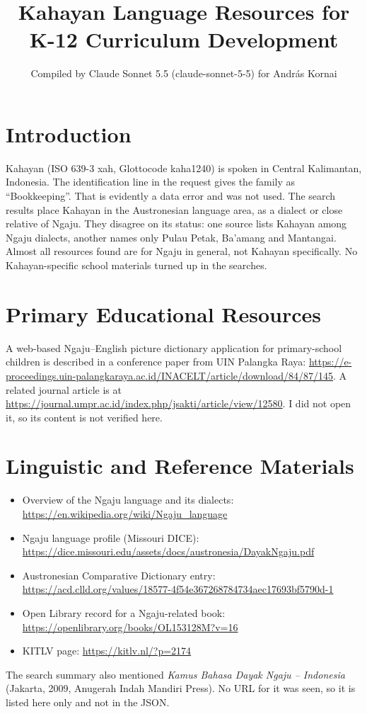 \documentclass[12pt]{article}
\title{Kahayan Language Resources for K-12 Curriculum Development}
\author{Compiled by Claude Sonnet 5.5 (claude-sonnet-5-5) for Andr\'as Kornai}
\date{}
\begin{document}
\maketitle

\section{Introduction}
Kahayan (ISO 639-3 xah, Glottocode kaha1240) is spoken in Central Kalimantan, Indonesia. The identification line in the request gives the family as ``Bookkeeping''. That is evidently a data error and was not used. The search results place Kahayan in the Austronesian language area, as a dialect or close relative of Ngaju. They disagree on its status: one source lists Kahayan among Ngaju dialects, another names only Pulau Petak, Ba'amang and Mantangai. Almost all resources found are for Ngaju in general, not Kahayan specifically. No Kahayan-specific school materials turned up in the searches.

\section{Primary Educational Resources}
A web-based Ngaju--English picture dictionary application for primary-school children is described in a conference paper from UIN Palangka Raya:
\url{https://e-proceedings.uin-palangkaraya.ac.id/INACELT/article/download/84/87/145}.
A related journal article is at \url{https://journal.umpr.ac.id/index.php/jsakti/article/view/12580}. I did not open it, so its content is not verified here.

\section{Linguistic and Reference Materials}
\begin{itemize}
\item Overview of the Ngaju language and its dialects: \url{https://en.wikipedia.org/wiki/Ngaju_language}
\item Ngaju language profile (Missouri DICE): \url{https://dice.missouri.edu/assets/docs/austronesia/DayakNgaju.pdf}
\item Austronesian Comparative Dictionary entry: \url{https://acd.clld.org/values/18577-4f54e367268784734aec17693bf5790d-1}
\item Open Library record for a Ngaju-related book: \url{https://openlibrary.org/books/OL153128M?v=16}
\item KITLV page: \url{https://kitlv.nl/?p=2174}
\end{itemize}
The search summary also mentioned \emph{Kamus Bahasa Dayak Ngaju -- Indonesia} (Jakarta, 2009, Anugerah Indah Mandiri Press). No URL for it was seen, so it is listed here only and not in the JSON.
\end{document}
